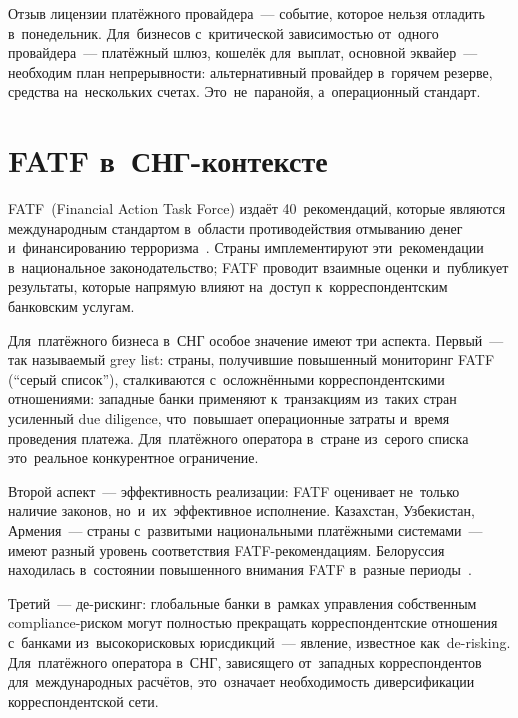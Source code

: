 \begin{important}
  Отзыв лицензии платёжного провайдера~--- событие, которое нельзя
  отладить в~понедельник. Для~бизнесов с~критической зависимостью от~одного
  провайдера~--- платёжный шлюз, кошелёк для~выплат, основной эквайер~---
  необходим план непрерывности: альтернативный провайдер в~горячем резерве,
  средства на~нескольких счетах. Это~не~паранойя, а~операционный стандарт.
\end{important}


\section{FATF в~СНГ-контексте}
\label{sec:compliance-fatf}

FATF~(Financial Action Task Force) издаёт 40~рекомендаций, которые
являются международным стандартом в~области противодействия отмыванию
денег и~финансированию терроризма~. Страны имплементируют
эти~рекомендации в~национальное законодательство; FATF проводит взаимные
оценки и~публикует результаты, которые напрямую влияют на~доступ
к~корреспондентским банковским услугам.

Для~платёжного бизнеса в~СНГ особое значение имеют три аспекта. Первый~---
так называемый grey list: страны, получившие повышенный мониторинг FATF
(\enquote{серый список}), сталкиваются с~осложнёнными корреспондентскими
отношениями: западные банки применяют к~транзакциям из~таких стран
усиленный due diligence, что~повышает операционные затраты и~время
проведения платежа. Для~платёжного оператора в~стране из~серого
списка это~реальное конкурентное ограничение.

Второй аспект~--- эффективность реализации: FATF оценивает не~только
наличие законов, но~и~их~эффективное исполнение. Казахстан, Узбекистан,
Армения~--- страны с~развитыми национальными платёжными системами~---
имеют разный уровень соответствия FATF-рекомендациям. Белоруссия находилась
в~состоянии повышенного внимания FATF в~разные периоды~.

Третий~--- де-рискинг: глобальные банки в~рамках управления
собственным compliance-риском могут полностью прекращать корреспондентские
отношения с~банками из~высокорисковых юрисдикций~--- явление, известное
как~de-risking. Для~платёжного оператора в~СНГ, зависящего от~западных
корреспондентов для~международных расчётов, это~означает необходимость
диверсификации корреспондентской сети.

